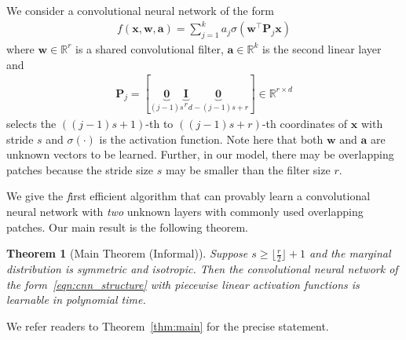 \documentclass[11pt]{article}
\newcommand{\mat}[1]{\mathbf{#1}}
\newcommand{\vect}[1]{\mathbf{#1}}
\newcommand{\relu}[1]{\sigma\left(#1\right)}
\newtheorem{thm}{Theorem}[section]
\begin{document}
We consider a convolutional neural network of the form
\begin{align}
f\left(\vect{x},\vect{w},\vect{a}\right)= \sum_{j=1}^{k} a_j \relu{\vect{w}^\top\mat{P}_j\vect{x}} \label{eqn:cnn_structure}
\end{align}
where $\vect{w} \in \mathbb{R}^r$ is a shared convolutional filter, $\vect{a} \in \mathbb{R}^{k}$ is the second linear  layer and\begin{align*}
\mat{P}_j = [
\underbrace{\mat{0}}_{(j-1)s}  \underbrace{\mat{I}}_r  \underbrace{\mat{0}}_{d-(j-1)s+r}]\in \mathbb{R}^{r \times d}
\end{align*} 
selects the $((j-1)s+1)$-th to $((j-1)s+r)$-th coordinates of $\vect{x}$ with stride $s$ and $\sigma\left(\cdot\right)$ is the activation function.
Note here that both $\vect{w}$ and $\vect{a}$ are unknown vectors to be learned.
Further, in our model, there may be overlapping patches because the stride size $s$ may be smaller than the filter size $r$.

We give the {\emph first} efficient algorithm that can provably learn a convolutional neural network with \emph{two} unknown layers with commonly used overlapping patches. Our main result is the following theorem.
\begin{thm}[Main Theorem (Informal)]
	\label{thm:main_informal}
	Suppose $s \ge \lfloor \frac{r}{2} \rfloor + 1$ and the marginal distribution is symmetric and isotropic.  Then the convolutional neural network of the form~\eqref{eqn:cnn_structure} with piecewise linear activation functions is learnable in polynomial time.
\end{thm}
We refer readers to Theorem~\ref{thm:main} for the precise statement.  
\end{document}
